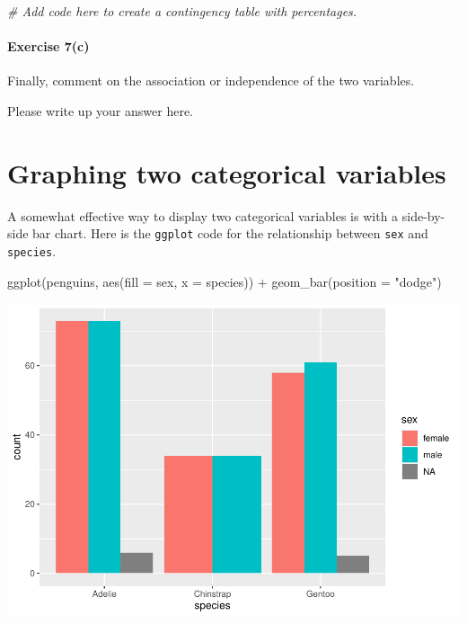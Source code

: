 \documentclass[
]{book}
\newenvironment{Shaded}{\begin{snugshade}}{\end{snugshade}}
\newcommand{\AttributeTok}[1]{\textcolor[rgb]{0.77,0.63,0.00}{#1}}
\newcommand{\CommentTok}[1]{\textcolor[rgb]{0.56,0.35,0.01}{\textit{#1}}}
\newcommand{\FunctionTok}[1]{\textcolor[rgb]{0.00,0.00,0.00}{#1}}
\newcommand{\NormalTok}[1]{#1}
\newcommand{\SpecialCharTok}[1]{\textcolor[rgb]{0.00,0.00,0.00}{#1}}
\newcommand{\StringTok}[1]{\textcolor[rgb]{0.31,0.60,0.02}{#1}}
\begin{document}
\begin{Shaded}
\begin{Highlighting}[]
\CommentTok{\# Add code here to create a contingency table with percentages.}
\end{Highlighting}
\end{Shaded}

\hypertarget{exercise-7c}{%
\paragraph*{Exercise 7(c)}\label{exercise-7c}}

Finally, comment on the association or independence of the two variables.

Please write up your answer here.

\hypertarget{categorical-graphing-two}{%
\section{Graphing two categorical variables}\label{categorical-graphing-two}}

A somewhat effective way to display two categorical variables is with a side-by-side bar chart. Here is the \texttt{ggplot} code for the relationship between \texttt{sex} and \texttt{species}.

\begin{Shaded}
\begin{Highlighting}[]
\FunctionTok{ggplot}\NormalTok{(penguins, }\FunctionTok{aes}\NormalTok{(}\AttributeTok{fill =}\NormalTok{ sex, }\AttributeTok{x =}\NormalTok{ species)) }\SpecialCharTok{+}
    \FunctionTok{geom\_bar}\NormalTok{(}\AttributeTok{position =} \StringTok{"dodge"}\NormalTok{)}
\end{Highlighting}
\end{Shaded}

\includegraphics{intro_stats_files/figure-latex/unnamed-chunk-59-1.pdf}
\end{document}
